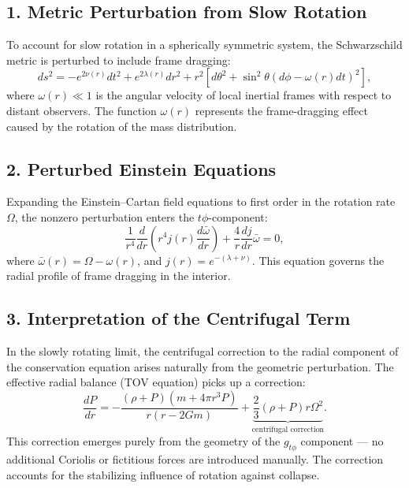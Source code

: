 \documentclass{article}
\begin{document}
\subsection*{1. Metric Perturbation from Slow Rotation}
To account for slow rotation in a spherically symmetric system, the Schwarzschild metric is perturbed to include frame dragging:
\begin{equation}
  ds^2 = -e^{2\nu(r)} dt^2 + e^{2\lambda(r)} dr^2 + r^2 \left[d\theta^2 + \sin^2\theta (d\phi - \omega(r) dt)^2\right],
\end{equation}
where \( \omega(r) \ll 1 \) is the angular velocity of local inertial frames with respect to distant observers. The function \( \omega(r) \) represents the frame-dragging effect caused by the rotation of the mass distribution.

\subsection*{2. Perturbed Einstein Equations}
Expanding the Einstein–Cartan field equations to first order in the rotation rate \( \Omega \), the nonzero perturbation enters the \( t\phi \)-component:
\begin{equation}
  \frac{1}{r^4} \frac{d}{dr} \left( r^4 j(r) \frac{d\bar\omega}{dr} \right) + \frac{4}{r} \frac{dj}{dr} \bar\omega = 0,
\end{equation}
where \( \bar\omega(r) = \Omega - \omega(r) \), and \( j(r) = e^{-(\lambda + \nu)} \). This equation governs the radial profile of frame dragging in the interior.

\subsection*{3. Interpretation of the Centrifugal Term}
In the slowly rotating limit, the centrifugal correction to the radial component of the conservation equation arises naturally from the geometric perturbation. The effective radial balance (TOV equation) picks up a correction:
\begin{equation}
  \frac{dP}{dr} = -\frac{(\rho + P)(m + 4\pi r^3 P)}{r(r - 2Gm)} + \underbrace{\frac{2}{3} (\rho + P) r \Omega^2}_{\text{centrifugal correction}}.
\end{equation}
This correction emerges purely from the geometry of the \( g_{t\phi} \) component — no additional Coriolis or fictitious forces are introduced manually. The correction accounts for the stabilizing influence of rotation against collapse.
\end{document}
